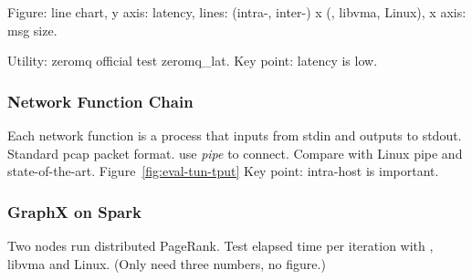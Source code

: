 Figure: line chart, y axis: latency, lines: (intra-, inter-) x (\sys{}, libvma, Linux), x axis: msg size.

Utility: zeromq official test zeromq\_lat.
Key point: latency is low.

\subsubsection{Network Function Chain}
\quad

Each network function is a process that inputs from stdin and outputs to stdout. Standard pcap packet format. use \emph{pipe} to connect. Compare with Linux pipe and state-of-the-art. Figure~\ref{fig:eval-tun-tput}
Key point: intra-host is important.

\subsubsection{GraphX on Spark}
\quad

Two nodes run distributed PageRank.
Test elapsed time per iteration with \sys{}, libvma and Linux. (Only need three numbers, no figure.)